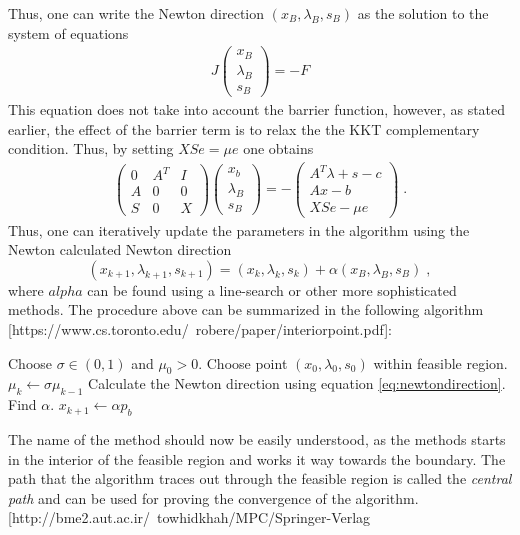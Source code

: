Thus, one can write the Newton direction $(x_B , \lambda_B , s_B)$ as the solution to the system of equations
\begin{align}
J \begin{pmatrix}
           x_B \\
           \lambda_B \\
           s_B
         \end{pmatrix} = -F
\end{align}
This equation does not take into account the barrier function, however, as stated earlier, the effect of the barrier term is to relax the the KKT complementary condition. Thus, by setting $X S e = \mu e$ one obtains
\begin{align}
	\begin{pmatrix}
    	 0 & A^T & I    \\
         A & 0 & 0 		\\
         S & 0 & X
    \end{pmatrix} 
    \begin{pmatrix}
    	x_b 		    \\
        \lambda_B		\\
        s_B
    \end{pmatrix} =
    - \begin{pmatrix}
    	  A^T \lambda + s - c 	\\
          A x - b 				\\
          X S e - \mu e
    \end{pmatrix} \; . \label{eq:newtondirection}
\end{align}
Thus, one can iteratively update the parameters in the algorithm using the Newton calculated Newton direction
\begin{equation}
	(x_{k+1} , \lambda_{k+1} , s _{k+1}) = (x_{k} , \lambda_{k} , s _{k}) + \alpha  (x_B , \lambda_B , s_B) \; , \label{eq:newtonstep}
\end{equation}
where $alpha$ can be found using a line-search or other more sophisticated methods.
The procedure above can be summarized in the following algorithm [https://www.cs.toronto.edu/~robere/paper/interiorpoint.pdf]:\\
\begin{algorithmic}
\State Choose $\sigma \in (0,1)$ and $\mu_0 > 0$.
\State Choose point $(x_0 , \lambda_0 , s_0)$ within feasible region.
	\State $\mu_k \gets \sigma \mu_{k-1}$
	\State Calculate the Newton direction using equation \ref{eq:newtondirection}.
	\State Find $\alpha$.
	\State $x_{k+1} \gets \alpha p_b$
\EndFor
\end{algorithmic}
The name of the method should now be easily understood, as the methods starts in the interior of the feasible region and works it way towards the boundary. The path that the algorithm traces out through the feasible region is called the \textit{central path} and can be used for proving the convergence of the algorithm. [http://bme2.aut.ac.ir/~towhidkhah/MPC/Springer-Verlag%

